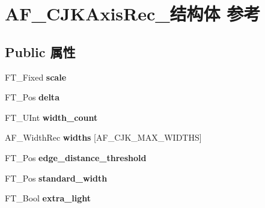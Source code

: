 \hypertarget{struct_a_f___c_j_k_axis_rec__}{}\section{A\+F\+\_\+\+C\+J\+K\+Axis\+Rec\+\_\+结构体 参考}
\label{struct_a_f___c_j_k_axis_rec__}
\subsection*{Public 属性}
\begin{DoxyCompactItemize}
\item 
\mbox{\label{struct_a_f___c_j_k_axis_rec___a4d6df84b7d89a3259abb8b189843776b}} 
F\+T\+\_\+\+Fixed {\bfseries scale}
\item 
\mbox{\label{struct_a_f___c_j_k_axis_rec___aaf3209544da6f08aa1079f871dba436e}} 
F\+T\+\_\+\+Pos {\bfseries delta}
\item 
\mbox{\label{struct_a_f___c_j_k_axis_rec___a297231b63842fb002e87623d4682b4f7}} 
F\+T\+\_\+\+U\+Int {\bfseries width\+\_\+count}
\item 
\mbox{\label{struct_a_f___c_j_k_axis_rec___ab78b56cea9f5a957e1d575e87b272fc4}} 
A\+F\+\_\+\+Width\+Rec {\bfseries widths} \mbox{[}A\+F\+\_\+\+C\+J\+K\+\_\+\+M\+A\+X\+\_\+\+W\+I\+D\+T\+HS\mbox{]}
\item 
\mbox{\label{struct_a_f___c_j_k_axis_rec___a830af0400bf97d6f649de1f099db6146}} 
F\+T\+\_\+\+Pos {\bfseries edge\+\_\+distance\+\_\+threshold}
\item 
\mbox{\label{struct_a_f___c_j_k_axis_rec___a467289850108e1c9cf051fc2aede25d4}} 
F\+T\+\_\+\+Pos {\bfseries standard\+\_\+width}
\item 
\mbox{\label{struct_a_f___c_j_k_axis_rec___abdf07ba39eef4ba3f206a7dd6fc1f832}} 
F\+T\+\_\+\+Bool {\bfseries extra\+\_\+light}
\item 
\mbox{\label{struct_a_f___c_j_k_axis_rec___ad65e2fcc420636af83b7bfeb4855817c}} 

\end{DoxyCompactItemize}
